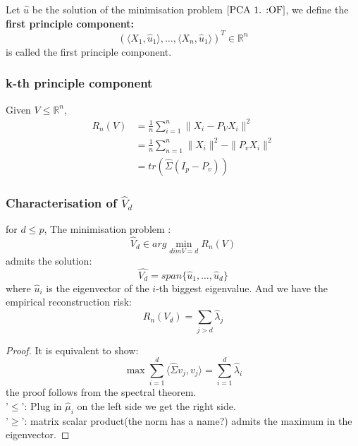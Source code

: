 \begin{definition}
 Let $\hat{u}$ be the solution of the minimisation problem $\ref{PCA 1. :OF}$, we define the \textbf{first principle component:}
\begin{equation}\label{PCA 1.}
	(\langle X_1, \hat{u}_1 \rangle , \dots, \langle X_n, \hat{u}_1 \rangle)^T \in \mathbb{R}^n
\end{equation} 
is called the first principle component.
\end{definition}
 
 
\subsubsection*{k-th principle component}
\begin{definition}
Given $V \leq \mathbb{R}^n$, 
\begin{align*}
	R_n(V) 
		&= \frac{1}{n} \sum_{i = 1}^n \| X_i - P_V X_i \|^2\\
		&= \frac{1}{n} \sum_{n = 1}^n \|X_i\|^2 - \|P_v X_i\|^2\\
	 	&= tr(\hat{\Sigma}(I_p - P_v))
\end{align*}
\end{definition}








\subsubsection*{Characterisation of $\hat{V}_d$}

\begin{theorem}
	for $d \leq p$, The minimisation problem :
	\begin{equation}
		\hat{V}_d \in arg \min_{dim V = d} R_n(V)
	\end{equation}
	admits the solution:
	\begin{equation*}
		\hat{V_d} = span\{ \hat{u}_1, \dots, \hat{u}_d \} 
	\end{equation*}
	where $\hat{u}_i$ is the eigenvector of the $i$-th biggest eigenvalue. And we have the empirical reconstruction risk:
	\begin{equation}
		R_n (V_d) = \sum_{j > d } \hat{\lambda}_j
	\end{equation}
\end{theorem}

\begin{proof}
It is equivalent to show:
\begin{equation*}
	\max \sum_{i = 1}^d \langle \hat{\Sigma} v_j, v_j \rangle = \sum_{i = 1}^d \hat{\lambda}_i
\end{equation*}
the proof follows from the spectral theorem.\\
'$\leq$': Plug in $\hat{\mu}_i$ on the left side we get the right side. \\
'$\geq$': matrix scalar product(the norm has a name?) admits the maximum in the eigenvector.
\end{proof}


